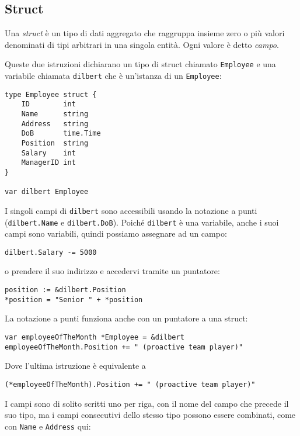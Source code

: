 \documentclass[../../thesis.tex]{subfiles}
\begin{document}
    \subsection{Struct}\label{subsec:struct}
    Una \textit{struct} è un tipo di dati aggregato che raggruppa insieme zero o più valori denominati di tipi arbitrari in una singola entità.
    Ogni valore è detto \textit{campo}.
    \hfill \vspace{12pt}

    Queste due istruzioni dichiarano un tipo di struct chiamato \verb"Employee" e una variabile chiamata \verb"dilbert" che è un'istanza di un \verb"Employee":
    \begin{lstlisting}[frame = single,label={lst:lstlisting3-4.1}]
type Employee struct {
    ID 	      int
    Name      string
    Address   string
    DoB       time.Time
    Position  string
    Salary    int
    ManagerID int
}

var dilbert Employee
    \end{lstlisting}
    I singoli campi di \verb"dilbert" sono accessibili usando la notazione a punti (\verb"dilbert.Name" e \verb"dilbert.DoB").
    Poiché \verb"dilbert" è una variabile, anche i suoi campi sono variabili, quindi possiamo assegnare ad un campo:
    \begin{lstlisting}[frame = single,label={lst:lstlisting3-4.2}]
dilbert.Salary -= 5000
    \end{lstlisting}
    o prendere il suo indirizzo e accedervi tramite un puntatore:
    \begin{lstlisting}[frame = single,label={lst:lstlisting3-4.3}]
position := &dilbert.Position
*position = "Senior " + *position
    \end{lstlisting}
    La notazione a punti funziona anche con un puntatore a una struct:
    \begin{lstlisting}[frame = single,label={lst:lstlisting3-4.4}]
var employeeOfTheMonth *Employee = &dilbert
employeeOfTheMonth.Position += " (proactive team player)"
    \end{lstlisting}
    Dove l'ultima istruzione è equivalente a
    \begin{lstlisting}[frame = single,label={lst:lstlisting3-4.5}]
(*employeeOfTheMonth).Position += " (proactive team player)"
    \end{lstlisting}
    I campi sono di solito scritti uno per riga, con il nome del campo che precede il suo tipo, ma i campi consecutivi dello stesso tipo possono essere combinati, come con \verb"Name" e \verb"Address" qui:
\end{document}
